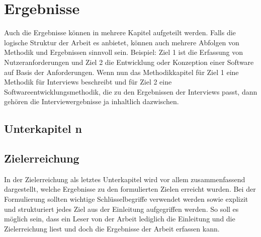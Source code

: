 \chapter{Ergebnisse}\label{ch:results}
\begin{temp}
Auch die Ergebnisse können in mehrere Kapitel aufgeteilt werden.
Falls die logische Struktur der Arbeit es anbietet, können auch mehrere Abfolgen von Methodik und Ergebnissen sinnvoll sein.
Beispiel: Ziel 1 ist die Erfassung von Nutzeranforderungen und Ziel 2 die Entwicklung oder Konzeption einer Software auf Basis der Anforderungen.
Wenn nun das Methodikkapitel für Ziel 1 eine Methodik für Interviews beschreibt und für Ziel 2 eine Softwareentwicklungsmethodik, die zu den Ergebnissen der Interviews passt, dann gehören die Interviewergebnisse ja inhaltlich dazwischen.

\section{Unterkapitel n}

\section{Zielerreichung}
In der Zielerreichung als letztes Unterkapitel wird vor allem zusammenfassend dargestellt, welche Ergebnisse zu den formulierten Zielen erreicht wurden.
Bei der Formulierung sollten wichtige Schlüsselbegriffe verwendet werden sowie explizit und strukturiert jedes Ziel aus der Einleitung aufgegriffen werden.
So soll es möglich sein, dass ein Leser von der Arbeit lediglich die Einleitung und die Zielerreichung liest und doch die Ergebnisse der Arbeit erfassen kann.
\end{temp}
